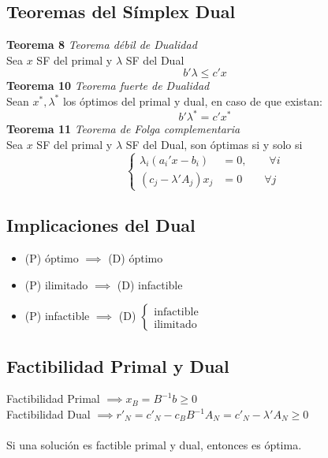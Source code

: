 \documentclass{myclass}
\begin{document}
\subsection{Teoremas del Símplex Dual}
\textbf{Teorema 8} \textit{Teorema débil de Dualidad} \\
Sea $x$ SF del primal y $\lambda$ SF del Dual
$$ b'\lambda \leq c'x$$
\textbf{Teorema 10} \textit{Teorema fuerte de Dualidad}\\
Sean $x^*, \lambda^*$ los óptimos del primal y dual, en caso de que existan:
$$b'\lambda^* = c'x^*$$
\textbf{Teorema 11} \textit{Teorema de Folga complementaria}\\
Sea $x$ SF del primal y $\lambda$ SF del Dual, son óptimas si y solo si
$$
\begin{cases}
\lambda_i(a_i'x - b_i) &= 0, \qquad \forall i \\
(c_j-\lambda'A_j)x_j &= 0 \qquad \forall j
\end{cases}
$$

\subsection{Implicaciones del Dual}
\begin{itemize}
    \item (P) óptimo $\implies$ (D) óptimo
    \item (P) ilimitado $\implies$ (D) infactible
    \item (P) infactible $\implies$ (D) $\begin{cases} \text{infactible} \\ \text{ilimitado} \end{cases}$
\end{itemize}
\subsection{Factibilidad Primal y Dual}
Factibilidad Primal $\implies x_B=B^{-1}b \geq 0$ \\
Factibilidad Dual $\implies r'_N = c'_N - c_B B^{-1} A_N = c'_N - \lambda' A_N \geq 0$ \\
\\
Si una solución es factible primal y dual, entonces es óptima. 
\end{document}
